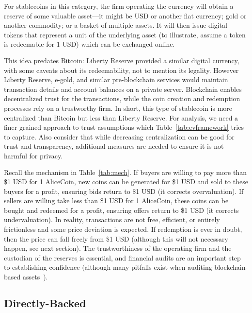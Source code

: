For stablecoins in this category, the firm operating the currency will obtain a reserve of some valuable asset---it might be USD or another fiat currency; gold or another commodity; or a basket of multiple assets.  It will then issue digital tokens that represent a unit of the underlying asset (to illustrate, assume a token is redeemable for 1 USD) which can be exchanged online.

This idea predates Bitcoin: Liberty Reserve provided a similar digital currency, with some caveats about its redeemability, not to mention its legality. However Liberty Reserve, e-gold, and similar pre-blockchain services would maintain transaction details and account balances on a private server. Blockchain enables decentralized trust for the transactions, while the coin creation and redemption processes rely on a trustworthy firm. In short, this type of stablecoin is more centralized than Bitcoin but less than Liberty Reserve. For analysis, we need a finer grained approach to trust assumptions which Table~\ref{tab:evframework} tries to capture. Also consider that while decreasing centralization can be good for trust and transparency, additional measures are needed to ensure it is not harmful for privacy.

Recall the mechanism in Table~\ref{tab:mech}. If buyers are willing to pay more than \$1 USD for 1 AliceCoin, new coins can be generated for \$1 USD and sold to these buyers for a profit, ensuring bids return to \$1 USD (it corrects overvaluation). If sellers are willing take less than \$1 USD for 1 AliceCoin, these coins can be bought and redeemed for a profit, ensuring offers return to \$1 USD (it corrects undervaluation). In reality, transactions are not free, efficient, or entirely frictionless and some price deviation is expected. If redemption is ever in doubt, then the price can fall freely from \$1 USD (although this will not necessary happen, see next section). The trustworthiness of the operating firm and the custodian of the reserves is essential, and financial audits are an important step to establishing confidence (although many pitfalls exist when auditing blockchain-based assets~\cite{PBEC19}). 


\subsection{Directly-Backed}
\label{sec:tether}

